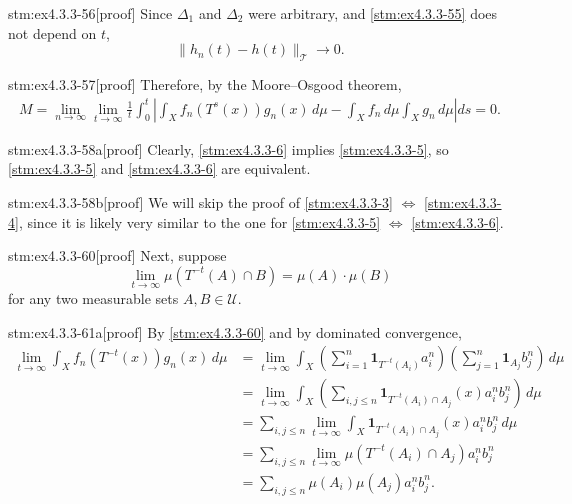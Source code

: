 \begin{stm}{stm:ex4.3.3-56}[proof]
Since $\Delta_1$ and $\Delta_2$ were arbitrary, and \ref{stm:ex4.3.3-55} does not depend on $t$, 
\[
\| h_n(t) - h(t) \|_{\mathcal{T}} \to 0.
\]
\end{stm}

\begin{stm}{stm:ex4.3.3-57}[proof]
Therefore, by the Moore–Osgood theorem,
\begin{align*}
M
= \lim_{n \to \infty} \lim_{t \to \infty} \frac{1}{t} \int_0^t 
\left| \int_X f_n(T^s(x)) g_n(x) \, d\mu 
- \int_X f_n \, d\mu \int_X g_n \, d\mu \right| ds = 0.
\end{align*}
\end{stm}

\begin{stm}{stm:ex4.3.3-58a}[proof]
Clearly, \ref{stm:ex4.3.3-6} implies \ref{stm:ex4.3.3-5}, so \ref{stm:ex4.3.3-5} and \ref{stm:ex4.3.3-6} are equivalent.
\end{stm}

\begin{stm}{stm:ex4.3.3-58b}[proof]
We will skip the proof of \ref{stm:ex4.3.3-3} $\Leftrightarrow$ \ref{stm:ex4.3.3-4}, since it is likely very similar to the one for \ref{stm:ex4.3.3-5} $\Leftrightarrow$ \ref{stm:ex4.3.3-6}. 
\end{stm}

\begin{stm}{stm:ex4.3.3-60}[proof]
Next, suppose 
\[
\lim_{t \to \infty} \mu(T^{-t}(A) \cap B) = \mu(A) \cdot \mu(B)
\]
for any two measurable sets $A, B \in \mathcal{U}$.
\end{stm}

\begin{stm}{stm:ex4.3.3-61a}[proof]
By \ref{stm:ex4.3.3-60} and by dominated convergence,
\begin{align*}
\lim_{t \to \infty} \int_X f_n(T^{-t}(x)) g_n(x) \, d\mu 
&= \lim_{t \to \infty} \int_X \left( \sum_{i=1}^n \mathbf{1}_{T^{-t}(A_i)} a_i^n \right) \left( \sum_{j=1}^n \mathbf{1}_{A_j} b_j^n \right) \, d\mu \\
&= \lim_{t \to \infty} \int_X \left( \sum_{i,j \leq n} \mathbf{1}_{T^{-t}(A_i) \cap A_j}(x) a_i^n b_j^n \right) \, d\mu \\
&= \sum_{i,j \leq n} \lim_{t \to \infty} \int_X \mathbf{1}_{T^{-t}(A_i) \cap A_j}(x) a_i^n b_j^n \, d\mu \\
&= \sum_{i,j \leq n} \lim_{t \to \infty} \mu(T^{-t}(A_i) \cap A_j) a_i^n b_j^n \\
&= \sum_{i,j \leq n} \mu(A_i) \mu(A_j) a_i^n b_j^n.
\end{align*}
\end{stm}

